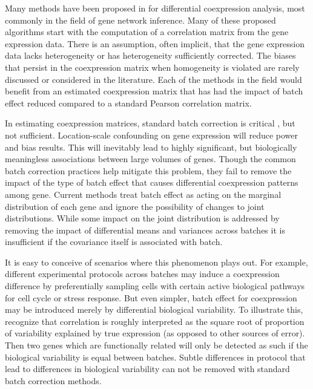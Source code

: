 Many methods have been proposed in for differential coexpression analysis,
most commonly in the field of gene network inference. Many of these
proposed algorithms start with the computation of a correlation matrix
from the gene expression data\cite{tesson2010diffcoex,wgcna1,wgcna2,glass2013passing,southworth2009aging,choi2005differential,siska2017differential}.
There is an assumption, often implicit, that the gene expression data
lacks heterogeneity or has heterogeneity sufficiently corrected. The
biases that persist in the coexpression matrix when homogeneity is
violated are rarely discussed or considered in the literature. Each
of the methods in the field would benefit from an estimated coexpression
matrix that has had the impact of batch effect reduced compared to
a standard Pearson correlation matrix.

In estimating coexpression matrices, standard batch correction is
critical \cite{furlotte2011mixed}, but not sufficient. Location-scale
confounding on gene expression will reduce power and bias results.
This will inevitably lead to highly significant, but biologically
meaningless associations between large volumes of genes. Though the
common batch correction practices help mitigate this problem, they
fail to remove the impact of the type of batch effect that causes
differential coexpression patterns among gene. Current methods treat
batch effect as acting on the marginal distribution of each gene and
ignore the possibility of changes to joint distributions. While some
impact on the joint distribution is addressed by removing the impact
of differential means and variances across batches it is insufficient
if the covariance itself is associated with batch. 

It is easy to conceive of scenarios where this phenomenon plays out.
For example, different experimental protocols across batches may induce
a coexpression difference by preferentially sampling cells with certain
active biological pathways for cell cycle or stress response. But
even simpler, batch effect for coexpression may be introduced merely
by differential biological variability. To illustrate this, recognize
that correlation is roughly interpreted as the square root of proportion
of variability explained by true expression (as opposed to other sources
of error). Then two genes which are functionally related will only
be detected as such if the biological variability is equal between
batches. Subtle differences in protocol that lead to differences in
biological variability can not be removed with standard batch correction
methods.

